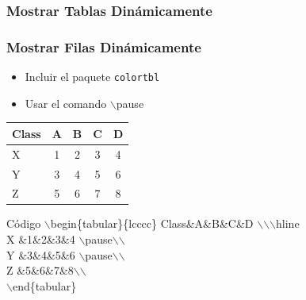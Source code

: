 \documentclass[aspectratio=43]{beamer}%
\begin{document}
\subsubsection{Mostrar Tablas Dinámicamente}
\begin{frame}
\frametitle{\textbf{Mostrar Filas Dinámicamente}}
\justifying
 \begin{itemize}\justifying
  \item Incluir el paquete \texttt{colortbl}
  \item Usar el comando $\backslash$pause
\end{itemize}

\begin{center}
\begin{tabular}{lcccc} 
Class&A&B&C&D \\\hline 
 X &1&2&3&4 \pause\\ 
Y &3&4&5&6 \pause\\
Z &5&6&7&8\\
\end{tabular}
\end{center}

\begin{exampleblock}{Código}
$\backslash$begin\{tabular\}\{lcccc\} 
Class\&A\&B\&C\&D $\backslash$$\backslash$$\backslash$hline \\
 X \&1\&2\&3\&4 $\backslash$pause$\backslash$$\backslash$\\ 
Y \&3\&4\&5\&6 $\backslash$pause$\backslash$$\backslash$\\
Z \&5\&6\&7\&8$\backslash$$\backslash$\\
$\backslash$end\{tabular\}
\end{exampleblock}

\end{frame}
\end{document}
